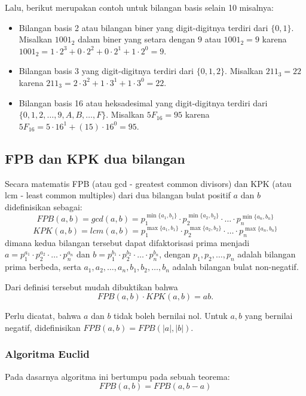 \documentclass[11pt]{scrartcl}
\begin{document}
    Lalu, berikut merupakan contoh untuk bilangan basis selain 10 misalnya: 
    \begin{itemize}
        \item Bilangan basis 2 atau bilangan biner yang digit-digitnya terdiri dari $\{0,1\}$. Misalkan $1001_2$ dalam biner yang setara dengan $9$ atau $1001_2 = 9$ karena $1001_2 = 1\cdot 2^3+0\cdot 2^2+0\cdot 2^1+1\cdot 2^0 = 9$. 
        \item Bilangan basis 3 yang digit-digitnya terdiri dari $\{0,1,2\}$. Misalkan $211_3 = 22$ karena $211_3 = 2\cdot 3^2+ 1\cdot 3^1+ 1\cdot 3^0 = 22$.
        \item Bilangan basis 16 atau heksadesimal yang digit-digitnya terdiri dari $\{0,1,2,\dots,9,A,B,\dots,F\}$. Misalkan $5F_{16} = 95$ karena $5F_{16} = 5 \cdot 16^1 + (15)\cdot 16^0 = 95$.
    \end{itemize}
    
    \subsection{FPB dan KPK dua bilangan}
        Secara matematis FPB (atau gcd - greatest common divisors) dan KPK (atau lcm - least common multiples) dari dua bilangan bulat positif $a$ dan $b$ 
        didefinisikan sebagai:
        $$FPB(a,b) = gcd(a,b) = p_1^{\min\{a_1,b_1\}}\cdot p_2^{\min\{a_2,b_2\}} \cdot \ldots \cdot p_n^{\min\{a_n,b_n\}}$$
        $$KPK(a,b) = lcm(a,b) =p_1^{\max\{a_1,b_1\}}\cdot p_2^{\max\{a_2,b_2\}} \cdot \ldots \cdot p_n^{\max\{a_n,b_n\}}$$
        dimana kedua bilangan tersebut dapat difaktorisasi prima menjadi
        $a=p_1^{a_1}\cdot p_2^{a_2}\cdot \ldots \cdot p_n^{a_n}$ dan $b=p_1^{b_1}\cdot p_2^{b_2} \cdot \ldots \cdot p_n^{b_n}$, dengan $p_1,p_2,\dots,p_n$ adalah bilangan prima berbeda, serta $a_1,a_2,\dots,a_n,b_1,b_2,\dots,b_n$ adalah bilangan bulat non-negatif.
        
        Dari definisi tersebut mudah dibuktikan bahwa
        $$FPB(a,b) \cdot KPK(a,b) = ab.$$
        
        Perlu dicatat, bahwa $a$ dan $b$ tidak boleh bernilai nol. Untuk $a,b$ yang bernilai negatif, didefinisikan $FPB(a,b) = FPB(|a|,|b|)$.
        \subsubsection{Algoritma Euclid}
        Pada dasarnya algoritma ini bertumpu pada sebuah teorema:
        $$FPB(a,b) = FPB(a,b-a)$$
        
\end{document}
